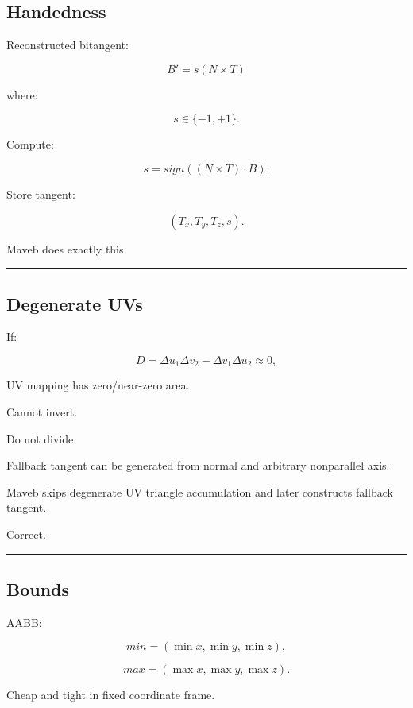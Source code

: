 \subsection{Handedness}\label{04-visual-computing-ii-ch041-handedness}

Reconstructed bitangent:

\[
B'
=
s(N\times T)
\]

where:

\[
s\in\{-1,+1\}.
\]

Compute:

\[
\boxed{
s=
sign(
(N\times T)\cdot B
).
}
\]

Store tangent:

\[
(T_x,T_y,T_z,s).
\]

Maveb does exactly this.

\begin{center}\rule{0.5\linewidth}{0.5pt}\end{center}

\subsection{Degenerate UVs}\label{04-visual-computing-ii-ch041-degenerate-uvs}

If:

\[
D
=
\Delta u_1\Delta v_2-
\Delta v_1\Delta u_2
\approx0,
\]

UV mapping has zero/near-zero area.

Cannot invert.

Do not divide.

Fallback tangent can be generated from normal and arbitrary nonparallel axis.

Maveb skips degenerate UV triangle accumulation and later constructs fallback tangent.

Correct.

\begin{center}\rule{0.5\linewidth}{0.5pt}\end{center}

\subsection{Bounds}\label{04-visual-computing-ii-ch041-bounds}

AABB:

\[
min=
(\min x,\min y,\min z),
\]

\[
max=
(\max x,\max y,\max z).
\]

Cheap and tight in fixed coordinate frame.

